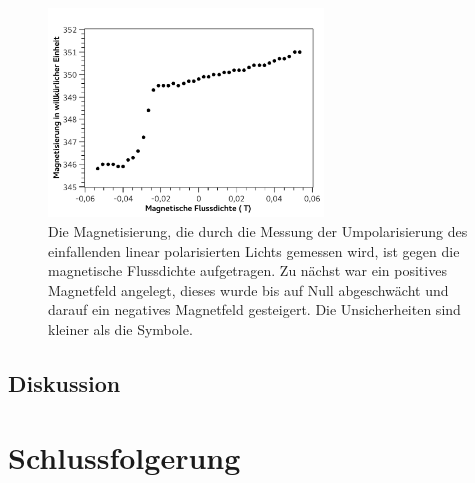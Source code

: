 \documentclass[
	a4paper,
	12pt,
	pagesize,
	ngerman
]{scrartcl}
\begin{document}
	\begin{figure}[H] 
		\includegraphics[width=0.65\textwidth]{fig_magn2}
		\centering
		\caption{Die Magnetisierung, die durch die Messung der Umpolarisierung des einfallenden linear polarisierten Lichts gemessen wird, ist gegen die magnetische Flussdichte aufgetragen. 
		Zu nächst war ein positives Magnetfeld angelegt, dieses wurde bis auf Null abgeschwächt und darauf ein negatives Magnetfeld gesteigert. 
		Die Unsicherheiten sind kleiner als die Symbole.} 
		\label{fig_magn2}
		\centering
	\end{figure}
	\subsection{Diskussion}

	
	\section{Schlussfolgerung}
	
\end{document}
